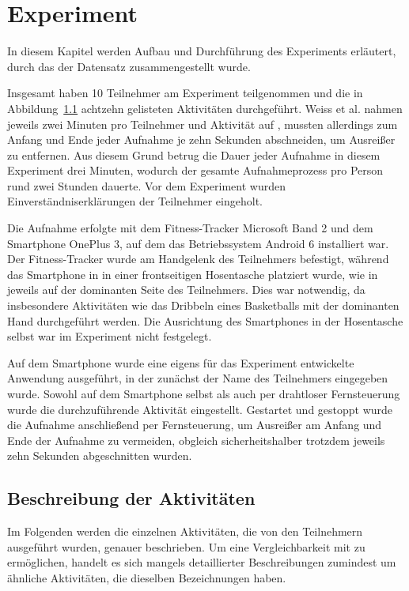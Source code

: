 \chapter{Experiment}
\label{chap:experiment}
In diesem Kapitel werden Aufbau und Durchführung des Experiments erläutert, durch das der Datensatz zusammengestellt wurde.

Insgesamt haben 10 Teilnehmer am Experiment teilgenommen und die in Abbildung~\ref{sec:activities} achtzehn gelisteten Aktivitäten durchgeführt. Weiss et al. nahmen jeweils zwei Minuten pro Teilnehmer und Aktivität auf \cite{Weiss2016}, mussten allerdings zum Anfang und Ende jeder Aufnahme je zehn Sekunden abschneiden, um Ausreißer zu entfernen. Aus diesem Grund betrug die Dauer jeder Aufnahme in diesem Experiment drei Minuten, wodurch der gesamte Aufnahmeprozess pro Person rund zwei Stunden dauerte. Vor dem Experiment wurden Einverständniserklärungen der Teilnehmer eingeholt.

Die Aufnahme erfolgte mit dem Fitness-Tracker Microsoft Band 2 und dem Smartphone OnePlus 3, auf dem das Betriebssystem Android 6 installiert war. Der Fitness-Tracker wurde am Handgelenk des Teilnehmers befestigt, während das Smartphone in in einer frontseitigen Hosentasche platziert wurde, wie in \cite{Weiss2016} jeweils auf der dominanten Seite des Teilnehmers. Dies war notwendig, da insbesondere Aktivitäten wie das Dribbeln eines Basketballs mit der dominanten Hand durchgeführt werden. Die Ausrichtung des Smartphones in der Hosentasche selbst war im Experiment nicht festgelegt.

Auf dem Smartphone wurde eine eigens für das Experiment entwickelte Anwendung ausgeführt, in der zunächst der Name des Teilnehmers eingegeben wurde. Sowohl auf dem Smartphone selbst als auch per drahtloser Fernsteuerung wurde die durchzuführende Aktivität eingestellt. Gestartet und gestoppt wurde die Aufnahme anschließend per Fernsteuerung, um Ausreißer am Anfang und Ende der Aufnahme zu vermeiden, obgleich sicherheitshalber trotzdem jeweils zehn Sekunden abgeschnitten wurden.

\section{Beschreibung der Aktivitäten}
\label{sec:activities}
Im Folgenden werden die einzelnen Aktivitäten, die von den Teilnehmern ausgeführt wurden, genauer beschrieben. Um eine Vergleichbarkeit mit \cite{Weiss2016} zu ermöglichen, handelt es sich mangels detaillierter Beschreibungen zumindest um ähnliche Aktivitäten, die dieselben Bezeichnungen haben.

